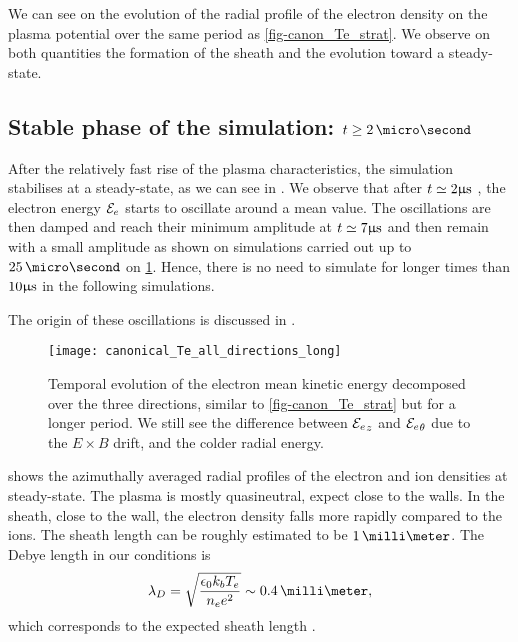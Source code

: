   We can see on  the evolution of the radial profile of the electron density on the plasma potential over the same period as \cref{fig-canon_Te_strat}.
  We observe on both quantities the formation of the sheath and the evolution toward a steady-state.
  
  \subsection{Stable phase of the simulation\string: $t \geq 2\,\micro\second$}
  \label{subsec-stablephase}
  After the relatively fast rise of the plasma characteristics, the simulation stabilises at a steady-state, as we can see in .
  We observe that after $t\simeq2\mathrm{\upmu s}$ , the electron energy ${\mathcal{E}_e}$ starts to oscillate around a mean value.
  The oscillations are then damped and reach their minimum amplitude at  $t\simeq 7\mathrm{\upmu s}$ and then remain with a small amplitude as shown on simulations carried out up to $25\,\micro\second$ on \cref{fig-canon_Te_all}.
  Hence, there is no need to simulate for longer times than $10\mathrm{\upmu s}$ in the following simulations.
  
  The origin of these oscillations is discussed in .
  
  
  \begin{figure}[hbt]
    \centering
    \texttt{[image: canonical\_Te\_all\_directions\_long]}
    \caption{Temporal evolution of the electron mean kinetic energy decomposed over the three directions, similar to \cref{fig-canon_Te_strat} but for a longer period. We still see the difference between ${\mathcal{E}_e}_z$ and ${\mathcal{E}_e}_{\theta}$ due to the $E\times B$ drift, and the colder radial energy.}
    \label{fig-canon_Te_all}
  \end{figure}
  

   shows the azimuthally averaged radial profiles of the electron and ion densities  at steady-state.
  The plasma is mostly quasineutral, expect close to the walls.
  In the sheath, close to the wall, the electron density falls more rapidly compared to the ions.
  The sheath length can be roughly estimated to be $1\,\milli\meter$.
  The Debye length in our conditions is
  \begin{equation} \label{eq-debye}
    \lambda_D = \sqrt{\frac{\epsilon_0 k_b T_e}{n_e e^2}} \sim 0.4\,\milli\meter,
  \end{equation}
  which corresponds to the expected sheath length \citep{chabert2014}.
  
